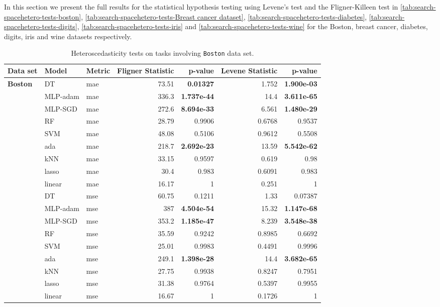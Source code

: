 \documentclass[jair,twoside,11pt,theapa]{article}
\theoremstyle{definition}
\begin{document}
In this section we present the full results for the statistical hypothesis testing using Levene's test and the Fligner-Killeen test in \autoref{tab:search-spacehetero-tests-boston}, \autoref{tab:search-spacehetero-tests-Breast cancer dataset}, \autoref{tab:search-spacehetero-tests-diabetes}, \autoref{tab:search-spacehetero-tests-digits}, \autoref{tab:search-spacehetero-tests-iris} and \autoref{tab:search-spacehetero-tests-wine} for the Boston, breast cancer, diabetes, digits, iris and wine datasets respectively.

\begin{table*}
\centering
\caption{Heteroscedasticity tests on tasks involving \texttt{Boston} data set.}
\label{tab:search-spacehetero-tests-boston}
\begin{tabular}{lllrrrr}
\toprule
Data set & Model & Metric & Fligner Statistic & p-value & Levene Statistic & p-value \\ 
\midrule
\textbf{Boston} & DT & mae & 73.51 & \textbf{0.01327} & 1.752 & \textbf{1.900e-03} \\ 
  & MLP-adam & mae & 336.3 & \textbf{1.737e-44} & 14.4 & \textbf{3.611e-65} \\ 
  & MLP-SGD & mae & 272.6 & \textbf{8.694e-33} & 6.561 & \textbf{1.480e-29} \\ 
  & RF & mae & 28.79 & 0.9906 & 0.6768 & 0.9537 \\ 
  & SVM & mae & 48.08 & 0.5106 & 0.9612 & 0.5508 \\ 
  & ada & mae & 218.7 & \textbf{2.692e-23} & 13.59 & \textbf{5.542e-62} \\ 
  & kNN & mae & 33.15 & 0.9597 & 0.619 & 0.98 \\ 
  & lasso & mae & 30.4 & 0.983 & 0.6091 & 0.983 \\ 
  & linear & mae & 16.17 & 1 & 0.251 & 1 \\ 
  & DT & mse & 60.75 & 0.1211 & 1.33 & 0.07387 \\ 
  & MLP-adam & mse & 387 & \textbf{4.504e-54} & 15.32 & \textbf{1.147e-68} \\ 
  & MLP-SGD & mse & 353.2 & \textbf{1.185e-47} & 8.239 & \textbf{3.548e-38} \\ 
  & RF & mse & 35.59 & 0.9242 & 0.8985 & 0.6692 \\ 
  & SVM & mse & 25.01 & 0.9983 & 0.4491 & 0.9996 \\ 
  & ada & mse & 249.1 & \textbf{1.398e-28} & 14.4 & \textbf{3.682e-65} \\ 
  & kNN & mse & 27.75 & 0.9938 & 0.8247 & 0.7951 \\ 
  & lasso & mse & 31.38 & 0.9764 & 0.5397 & 0.9955 \\ 
  & linear & mse & 16.67 & 1 & 0.1726 & 1 \\ 
\bottomrule
\end{tabular}
\end{table*}
\end{document}
